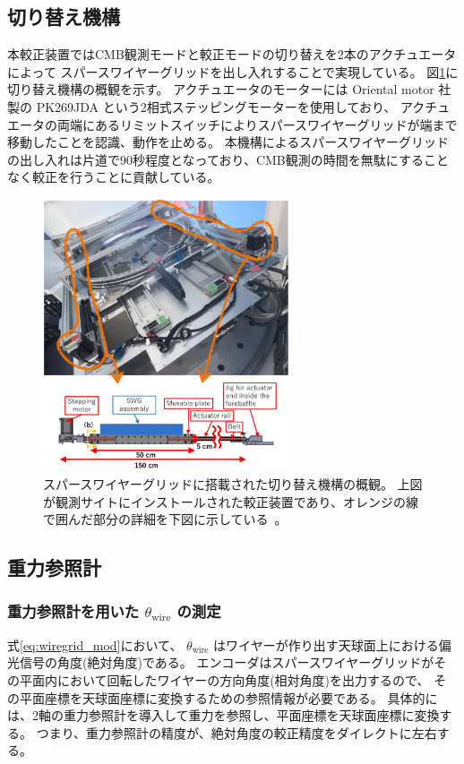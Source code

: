 \documentclass[../../main.tex]{subfiles}
\begin{document}
\subsection{切り替え機構}
本較正装置ではCMB観測モードと較正モードの切り替えを2本のアクチュエータによって
スパースワイヤーグリッドを出し入れすることで実現している。
図\ref{fig:gridloader}に切り替え機構の概観を示す。
アクチュエータのモーターには Oriental motor 社製の PK269JDA という2相式ステッピングモーターを使用しており、
アクチュエータの両端にあるリミットスイッチによりスパースワイヤーグリッドが端まで移動したことを認識、動作を止める。
本機構によるスパースワイヤーグリッドの出し入れは片道で$90$秒程度となっており、CMB観測の時間を無駄にすることなく較正を行うことに貢献している\cite{swg:nakata}。
\begin{figure}[H]
    \centering
    \includegraphics[width=0.65\textwidth]{wiregrid/wiregrid_actuator.pdf}
    \caption[スパースワイヤーグリッドに搭載された切り替え機構の概観]{スパースワイヤーグリッドに搭載された切り替え機構の概観。
    上図が観測サイトにインストールされた較正装置であり、オレンジの線で囲んだ部分の詳細を下図に示している~\cite{swg:Murata_2023}。}
    \label{fig:gridloader}
\end{figure}
\subsection{重力参照計}
\label{subsec:wg_tiltsensor}
\subsubsection{重力参照計を用いた $\theta_{\mathrm{wire}}$ の測定}
式\eqref{eq:wiregrid_mod}において、 $\theta_{\mathrm{wire}}$ はワイヤーが作り出す天球面上における偏光信号の角度(絶対角度)である。
エンコーダはスパースワイヤーグリッドがその平面内において回転したワイヤーの方向角度(相対角度)を出力するので、
その平面座標を天球面座標に変換するための参照情報が必要である。
具体的には、2軸の重力参照計を導入して重力を参照し、平面座標を天球面座標に変換する。
つまり、重力参照計の精度が、絶対角度の較正精度をダイレクトに左右する。
\end{document}

